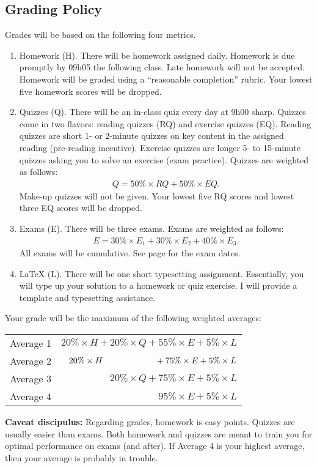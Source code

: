 %
%
%
%

\subsection{Grading Policy}

Grades will be based on the following four metrics.
\begin{enumerate}
\item Homework (H). There will be homework assigned daily. Homework is due promptly by 09h05 the following class. Late homework will not be accepted. Homework will be graded using a ``reasonable completion'' rubric. Your lowest five homework scores will be dropped.
\item Quizzes (Q). There will be an in-class quiz every day at 9h00 sharp. Quizzes come in two flavors: reading quizzes (RQ) and exercise quizzes (EQ). Reading quizzes are short 1- or 2-minute quizzes on key content in the assigned reading (pre-reading incentive). Exercise quizzes are longer 5- to 15-minute quizzes asking you to solve an exercise (exam practice). Quizzes are weighted as follows:
\begin{align*}
Q
=
50\% \times RQ + 50\% \times EQ.
\end{align*}
Make-up quizzes will not be given. Your lowest five RQ scores and lowest three EQ scores will be dropped.
\item Exams (E). There will be three exams. Exams are weighted as follows:
\begin{align*}
E
=
30\% \times E_{1} + 30\% \times E_{2} + 40\% \times E_{3}.
\end{align*}
All exams will be cumulative. See page \pageref{sec: Calendar} for the exam dates.
\item \LaTeX{} (L). There will be one short typesetting assignment. Essentially, you will type up your solution to a homework or quiz exercise. I will provide a template and typesetting assistance.
\end{enumerate}
Your grade will be the maximum of the following weighted averages:
\begin{center}
\begin{tabular}{r@{ = }r}
Average 1	&	$20\% \times H + 20\% \times Q + 55\% \times E + 5\% \times L$	\\
Average 2	&	$20\% \times H \hspace{21.5mm} + 75\% \times E + 5\% \times L$	\\
Average 3	&	$20\% \times Q + 75\% \times E + 5\% \times L$	\\
Average 4	&	$95\% \times E + 5\% \times L$	\\
\end{tabular}
\end{center}
\textbf{Caveat discipulus:} Regarding grades, homework is easy points. Quizzes are usually easier than exams. Both homework and quizzes are meant to train you for optimal performance on exams (and after). If Average 4 is your highest average, then your average is probably in trouble.





